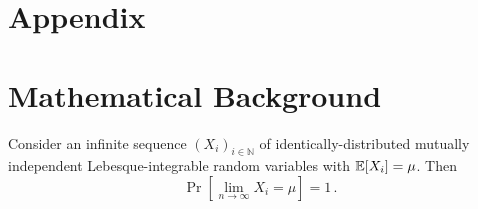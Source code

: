 \section*{Appendix}
\section{Mathematical Background}

\begin{theorem}
  Consider an infinite sequence $(X_i)_{i \in \mathbb{N}}$ of
  identically-distributed mutually independent Lebesque-integrable random
  variables with $\mathop{{}\mathbb{E}}[X_i] = \mu$. Then
  \[\Pr[\lim_{n\to\infty} X_i = \mu] = 1\,.\]
\end{theorem}
